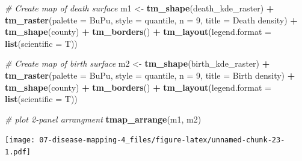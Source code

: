 \documentclass[
]{book}
\newenvironment{Shaded}{\begin{snugshade}}{\end{snugshade}}
\newcommand{\AttributeTok}[1]{\textcolor[rgb]{0.13,0.29,0.53}{#1}}
\newcommand{\CommentTok}[1]{\textcolor[rgb]{0.56,0.35,0.01}{\textit{#1}}}
\newcommand{\DecValTok}[1]{\textcolor[rgb]{0.00,0.00,0.81}{#1}}
\newcommand{\FunctionTok}[1]{\textcolor[rgb]{0.13,0.29,0.53}{\textbf{#1}}}
\newcommand{\NormalTok}[1]{#1}
\newcommand{\OtherTok}[1]{\textcolor[rgb]{0.56,0.35,0.01}{#1}}
\newcommand{\SpecialCharTok}[1]{\textcolor[rgb]{0.81,0.36,0.00}{\textbf{#1}}}
\newcommand{\StringTok}[1]{\textcolor[rgb]{0.31,0.60,0.02}{#1}}
\begin{document}
\begin{Shaded}
\begin{Highlighting}[]
\CommentTok{\# Create map of death surface}
\NormalTok{m1 }\OtherTok{\textless{}{-}} \FunctionTok{tm\_shape}\NormalTok{(death\_kde\_raster) }\SpecialCharTok{+} 
  \FunctionTok{tm\_raster}\NormalTok{(}\AttributeTok{palette =} \StringTok{\textquotesingle{}BuPu\textquotesingle{}}\NormalTok{,}
            \AttributeTok{style =} \StringTok{\textquotesingle{}quantile\textquotesingle{}}\NormalTok{,}
            \AttributeTok{n =} \DecValTok{9}\NormalTok{,}
            \AttributeTok{title =} \StringTok{\textquotesingle{}Death density\textquotesingle{}}\NormalTok{) }\SpecialCharTok{+}
  \FunctionTok{tm\_shape}\NormalTok{(county) }\SpecialCharTok{+}
    \FunctionTok{tm\_borders}\NormalTok{() }\SpecialCharTok{+} 
  \FunctionTok{tm\_layout}\NormalTok{(}\AttributeTok{legend.format =} \FunctionTok{list}\NormalTok{(}\AttributeTok{scientific =}\NormalTok{ T))}

\CommentTok{\# Create map of birth surface}
\NormalTok{m2 }\OtherTok{\textless{}{-}} \FunctionTok{tm\_shape}\NormalTok{(birth\_kde\_raster) }\SpecialCharTok{+}
  \FunctionTok{tm\_raster}\NormalTok{(}\AttributeTok{palette =} \StringTok{\textquotesingle{}BuPu\textquotesingle{}}\NormalTok{,}
            \AttributeTok{style =} \StringTok{\textquotesingle{}quantile\textquotesingle{}}\NormalTok{,}
            \AttributeTok{n =} \DecValTok{9}\NormalTok{,}
            \AttributeTok{title =} \StringTok{\textquotesingle{}Birth density\textquotesingle{}}\NormalTok{) }\SpecialCharTok{+}
  \FunctionTok{tm\_shape}\NormalTok{(county) }\SpecialCharTok{+}
    \FunctionTok{tm\_borders}\NormalTok{() }\SpecialCharTok{+} 
  \FunctionTok{tm\_layout}\NormalTok{(}\AttributeTok{legend.format =} \FunctionTok{list}\NormalTok{(}\AttributeTok{scientific =}\NormalTok{ T))}

\CommentTok{\# plot 2{-}panel arrangment}
\FunctionTok{tmap\_arrange}\NormalTok{(m1, m2)}
\end{Highlighting}
\end{Shaded}

\texttt{[image: 07-disease-mapping-4\_files/figure-latex/unnamed-chunk-23-1.pdf]}
\end{document}
